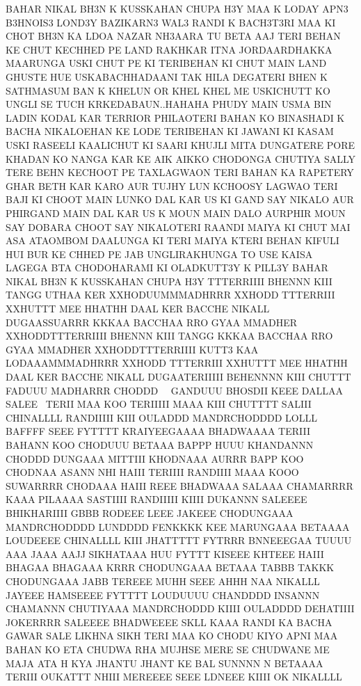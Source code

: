 BAHAR NIKAL BH3N K KUSSKAHAN CHUPA H3Y
MAA K LODAY APN3 B3HNOIS3 LOND3Y
BAZIKARN3 WAL3 RANDI K BACH3T3RI MAA KI
CHOT BH3N KA LDOA NAZAR NH3AARA TU BETA
AAJ TERI BEHAN KE CHUT KECHHED PE LAND
RAKHKAR ITNA JORDAARDHAKKA MAARUNGA
USKI CHUT PE KI TERIBEHAN KI CHUT MAIN
LAND GHUSTE HUE USKABACHHADAANI TAK
HILA DEGATERI BHEN K SATHMASUM BAN K
KHELUN OR KHEL KHEL ME USKICHUTT KO
UNGLI SE TUCH KRKEDABAUN..HAHAHA
PHUDY MAIN USMA BIN LADIN KODAL KAR
TERRIOR PHILAOTERI BAHAN KO BINASHADI K
BACHA NIKALOEHAN KE LODE TERIBEHAN KI
JAWANI KI KASAM USKI RASEELI KAALICHUT KI
SAARI KHUJLI MITA DUNGATERE PORE KHADAN
KO NANGA KAR KE AIK AIKKO CHODONGA
CHUTIYA SALLY TERE BEHN KECHOOT PE
TAXLAGWAON TERI BAHAN KA RAPETERY GHAR
BETH KAR KARO AUR TUJHY LUN KCHOOSY
LAGWAO TERI BAJI KI CHOOT MAIN LUNKO DAL
KAR US KI GAND SAY NIKALO AUR PHIRGAND
MAIN DAL KAR US K MOUN MAIN DALO
AURPHIR MOUN SAY DOBARA CHOOT SAY
NIKALOTERI RAANDI MAIYA KI CHUT MAI ASA
ATAOMBOM DAALUNGA KI TERI MAIYA KTERI
BEHAN KIFULI HUI BUR KE CHHED PE JAB
UNGLIRAKHUNGA TO USE KAISA LAGEGA BTA
CHODOHARAMI KI OLADKUTT3Y K PILL3Y
BAHAR NIKAL BH3N K KUSSKAHAN CHUPA H3Y
TTTERRIIII BHENNN KIII TANGG UTHAA KER XXHODUUMMMADHRRR 
XXHODD TTTERRIII XXHUTTT MEE HHATHH DAAL KER BACCHE NIKALL DUGAASSUARRR
KKKAA BACCHAA RRO GYAA MMADHER XXHODDTTTERRIIII BHENNN KIII TANGG KKKAA 
BACCHAA RRO GYAA MMADHER XXHODDTTTERRIIII KUTT3 KAA 
LODAAAMMMADHRRR XXHODD TTTERRIII XXHUTTT MEE HHATHH DAAL KER 
BACCHE NIKALL DUGAATERIIIII BEHENNNN KIII CHUTTT FADUUU 
MADHARRR CHODDD   GANDUUU BHOSDII KEEE DALLAA SALEE  TERII MAA KOO 
TERIIIII MAAA KIII CHUTTTT SALIII CHINALLLL
RANDIIIII KIII OULADDD MANDRCHODDDD LOLLL
BAFFFF SEEE FYTTTT KRAIYEEGAAAA BHADWAAAA TERIII BAHANN KOO CHODUUU
BETAAA BAPPP HUUU KHANDANNN CHODDD DUNGAAA 
MITTIII KHODNAAA AURRR BAPP KOO CHODNAA ASANN NHI HAIII
TERIIII RANDIIII MAAA KOOO SUWARRRR CHODAAA HAIII REEE
BHADWAAA SALAAA CHAMARRRR KAAA PILAAAA
SASTIIII RANDIIIII KIIII DUKANNN SALEEEE BHIKHARIIII
GBBB RODEEE LEEE JAKEEE CHODUNGAAA MANDRCHODDDD
LUNDDDD FENKKKK KEE MARUNGAAA BETAAAA LOUDEEEE
CHINALLLL KIII JHATTTTT FYTRRR BNNEEEGAA TUUUU
AAA JAAA AAJJ SIKHATAAA HUU FYTTT KISEEE KHTEEE HAIII
BHAGAA BHAGAAA KRRR CHODUNGAAA BETAAA
TABBB TAKKK CHODUNGAAA JABB TEREEE MUHH SEEE AHHH NAA NIKALLL JAYEEE 
HAMSEEEE FYTTTT LOUDUUUU CHANDDDD INSANNN 
CHAMANNN CHUTIYAAA MANDRCHODDD KIIII OULADDDD
DEHATIIII JOKERRRR SALEEEE BHADWEEEE SKLL KAAA 
RANDI KA BACHA GAWAR SALE LIKHNA SIKH TERI MAA KO CHODU 
KIYO APNI MAA BAHAN KO ETA CHUDWA RHA MUJHSE
MERE SE CHUDWANE ME MAJA ATA H KYA JHANTU JHANT KE BAL
SUNNNN N BETAAAA TERIII OUKATTT NHIII MEREEEE SEEE LDNEEE KIIII OK NIKALLLL
